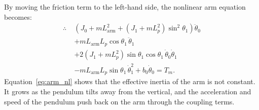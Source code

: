 \documentclass[a4paper,11pt]{article}
\newcommand{\La}{L_{\mathrm{arm}}}
\begin{document}
By moving the friction term to the left-hand side, the nonlinear arm equation becomes:
\begin{equation}
\begin{aligned}
  \therefore\; & \left(J_0 + m \La^2 + \left(J_1 + m L_p^2\right)\sin^2\theta_1\right)\ddot\theta_0\\
  & + m \La L_p \cos\theta_1\,\ddot\theta_1\\
  & + 2\left(J_1 + m L_p^2\right)\sin\theta_1 \cos\theta_1\,\dot\theta_0 \dot\theta_1\\
  & - m \La L_p \sin\theta_1\,\dot\theta_1^2 + b_0 \dot\theta_0 = T_m .
\end{aligned}
\label{eq:arm_nl}
\end{equation}
Equation~\ref{eq:arm_nl} shows that the effective inertia of the arm is not constant. It grows as the pendulum tilts away from the vertical, and the acceleration and speed of the pendulum push back on the arm through the coupling terms.
\end{document}
